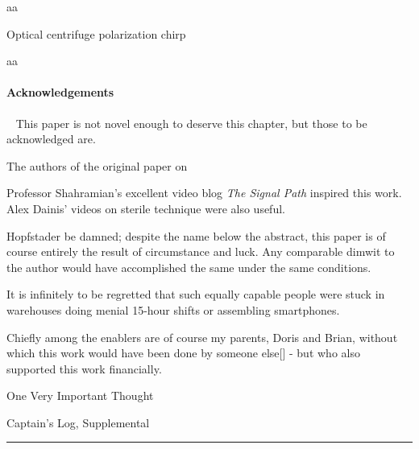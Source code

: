 \documentclass[fleqn,10pt]{article}
\begin{document}
\begin{multicols}{1}
\begin{multicols}{1}
aa





\end{multicols}




\clearpage
{\Large Optical centrifuge polarization chirp}\\
\begin{multicols}{1}


aa





\end{multicols}







\clearpage
\paragraph{Acknowledgements}\
This paper is not novel enough to deserve this chapter, but those to be acknowledged are.

The authors of the original paper on 

Professor Shahramian's excellent video blog {\it The Signal Path} inspired this work. Alex Dainis' videos on sterile technique were also useful.

Hopfstader be damned; despite the name below the abstract, this paper is of course entirely the result of circumstance and luck. Any comparable dimwit to the author would have accomplished the same under the same conditions. 

It is infinitely to be regretted that such equally capable people were stuck in warehouses doing menial 15-hour shifts or assembling smartphones.

Chiefly among the enablers are of course my parents, Doris and Brian, without which this work would have been done by someone else[] - but who also supported this work financially. 



One Very Important Thought


\clearpage

{\Large Captain's Log, Supplemental}\\


\rule{\linewidth}{0.2pt}


\end{multicols}
\end{document}
